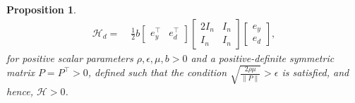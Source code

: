 \documentclass[journal,twoside]{IEEEtran}
\newtheorem{proposition}{Proposition}
\begin{document}
\begin{proposition}
\begin{align}
 {\mathcal H}_d=&\;  \frac{1}{2}b  \left[ \begin{array}{cc} e_y^\top  & e_d^\top  \end{array} \right]\left[ \begin{array}{cc} 2I_n &  I_n \\ I_n &  I_n \end{array} \right]   \left[ \begin{array}{c} e_y \\ e_d  \end{array} \right], 
 \end{align}
for positive scalar parameters $\rho, \epsilon, \mu, b > 0$ and a positive-definite symmetric matrix $P=P^\top > 0$, defined such that the condition $\sqrt{\frac{2 \rho \mu}{\|P\|}}> \epsilon$ is satisfied, and hence, ${\mathcal H}>0$. \end{proposition}
 
\end{document}
